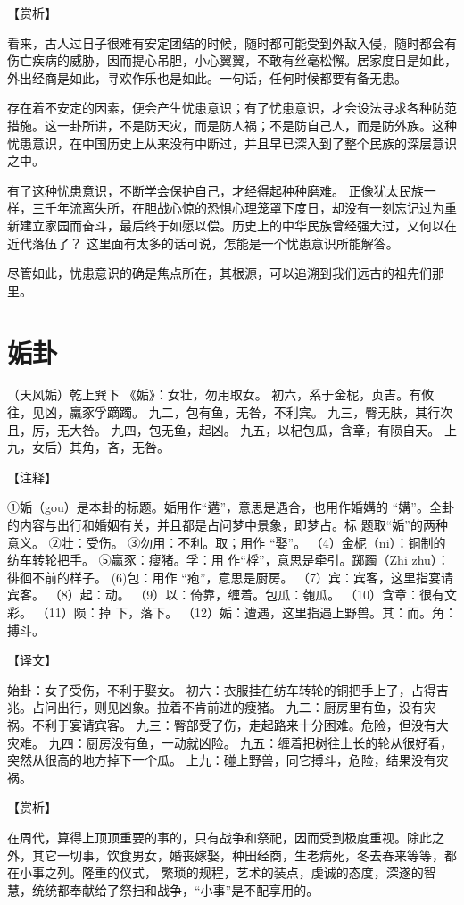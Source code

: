 \documentclass[a4paper,12pt,UTF8,twoside]{ctexbook}
\begin{document}
【赏析】

看来，古人过日子很难有安定团结的时候，随时都可能受到外敌入侵，随时都会有伤亡疾病的威胁，因而提心吊胆，小心翼翼，不敢有丝毫松懈。居家度日是如此，外出经商是如此，寻欢作乐也是如此。一句话，任何时候都要有备无患。

存在着不安定的因素，便会产生忧患意识；有了忧患意识，才会设法寻求各种防范措施。这一卦所讲，不是防天灾，而是防人祸；不是防自己人，而是防外族。这种忧患意识，在中国历史上从来没有中断过，并且早已深入到了整个民族的深层意识之中。

有了这种忧患意识，不断学会保护自己，才经得起种种磨难。 正像犹太民族一样，三千年流离失所，在胆战心惊的恐惧心理笼罩下度日，却没有一刻忘记过为重新建立家园而奋斗，最后终于如愿以偿。历史上的中华民族曾经强大过，又何以在近代落伍了？ 这里面有太多的话可说，怎能是一个忧患意识所能解答。

尽管如此，忧患意识的确是焦点所在，其根源，可以追溯到我们远古的祖先们那里。

\chapter{姤卦}

（天风姤）乾上巽下
《姤》：女壮，勿用取女。
初六，系于金柅，贞吉。有攸往，见凶，羸豕孚蹢躅。
九二，包有鱼，无咎，不利宾。
九三，臀无肤，其行次且，厉，无大咎。
九四，包无鱼，起凶。
九五，以杞包瓜，含章，有陨自天。
上九，女后）其角，吝，无咎。

【注释】

①姤（gou）是本卦的标题。姤用作“遘”，意思是遇合，也用作婚媾的 “媾”。全卦的内容与出行和婚姻有关，并且都是占问梦中景象，即梦占。标 题取“姤”的两种意义。
②壮：受伤。
③勿用：不利。取；用作 “娶”。
（4）金柅（ni）：铜制的纺车转轮把手。
⑤赢豕：瘦猪。孚：用 作“桴”，意思是牵引。踯躅（Zhi zhu）：徘徊不前的样子。
(6)包：用作 “疱”，意思是厨房。
（7）宾：宾客，这里指宴请宾客。
（8）起：动。
（9）以：倚靠，缠着。包瓜：匏瓜。
（10）含章：很有文彩。
（11）陨：掉 下，落下。
（12）姤：遭遇，这里指遇上野兽。其：而。角：搏斗。

【译文】

始卦：女子受伤，不利于娶女。
初六：衣服挂在纺车转轮的铜把手上了，占得吉兆。占问出行，则见凶象。拉着不肯前进的瘦猪。
九二：厨房里有鱼，没有灾祸。不利于宴请宾客。
九三：臀部受了伤，走起路来十分困难。危险，但没有大灾难。
九四：厨房没有鱼，一动就凶险。
九五：缠着把树往上长的轮从很好看，突然从很高的地方掉下一个瓜。
上九：碰上野兽，同它搏斗，危险，结果没有灾祸。

【赏析】

在周代，算得上顶顶重要的事的，只有战争和祭祀，因而受到极度重视。除此之外，其它一切事，饮食男女，婚丧嫁娶，种田经商，生老病死，冬去春来等等，都在小事之列。隆重的仪式， 繁琐的规程，艺术的装点，虔诚的态度，深遂的智慧，统统都奉献给了祭扫和战争，“小事”是不配享用的。
\end{document}
